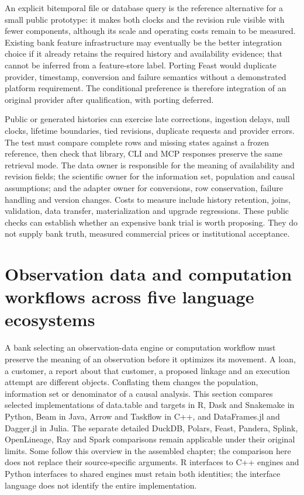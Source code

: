 An explicit bitemporal file or database query is the reference alternative
for a small public prototype: it makes both clocks and the revision rule
visible with fewer components, although its scale and operating costs remain
to be measured. Existing bank feature infrastructure may eventually be the
better integration choice if it already retains the required history and
availability evidence; that cannot be inferred from a feature-store label.
Porting Feast would duplicate provider, timestamp, conversion and failure
semantics without a demonstrated platform requirement. The conditional
preference is therefore integration of an original provider after
qualification, with porting deferred.

Public or generated histories can exercise late corrections, ingestion
delays, null clocks, lifetime boundaries, tied revisions, duplicate requests
and provider errors. The test must compare complete rows and missing states
against a frozen reference, then check that library, CLI and MCP responses
preserve the same retrieval mode. The data owner is responsible for the
meaning of availability and revision fields; the scientific owner for the
information set, population and causal assumptions; and the adapter owner
for conversions, row conservation, failure handling and version changes.
Costs to measure include history retention, joins, validation, data transfer,
materialization and upgrade regressions. These public checks can establish
whether an expensive bank trial is worth proposing. They do not supply bank
truth, measured commercial prices or institutional acceptance.


\section[Observation data and computation workflows]{Observation data and computation workflows across five language ecosystems}
\label{sec:exec25-dww}

A bank selecting an observation-data engine or computation workflow must preserve the meaning of an observation before it optimizes its movement. A loan, a customer, a report about that customer, a proposed linkage and an execution attempt are different objects. Conflating them changes the population, information set or denominator of a causal analysis. This section compares selected implementations of data.table and targets in R, Dask and Snakemake in Python, Beam in Java, Arrow and Taskflow in C++, and DataFrames.jl and Dagger.jl in Julia. The separate detailed DuckDB, Polars, Feast, Pandera, Splink, OpenLineage, Ray and Spark comparisons remain applicable under their original limits. Some follow this overview in the assembled chapter; the comparison here does not replace their source-specific arguments. R interfaces to C++ engines and Python interfaces to shared engines must retain both identities; the interface language does not identify the entire implementation.~\citep{exec25_dww_datatable,exec25_dww_targets,exec25_dww_dask,exec25_dww_snakemake,exec25_dww_beam,exec25_dww_arrow,exec25_dww_taskflow,exec25_dww_dataframes,exec25_dww_dagger,exec19_duckdb_source,exec23_polars_sources,exec25_otm_spark}

